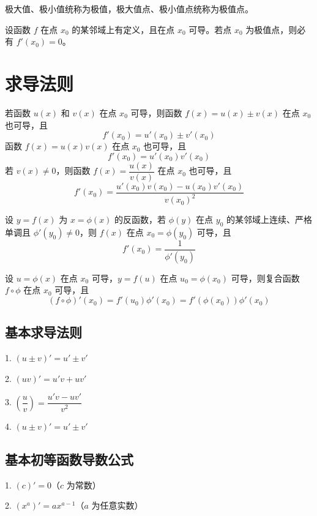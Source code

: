 极大值、极小值统称为极值，极大值点、极小值点统称为极值点。

\begin{theorem}[费马定理]
	设函数 $f$ 在点 $x_0$ 的某邻域上有定义，且在点 $x_0$ 可导。若点 $x_0$ 为极值点，则必有 $f'(x_0)=0$。
\end{theorem}

\section{求导法则}

\begin{theorem}
	若函数 $u(x)$ 和 $v(x)$ 在点 $x_0$ 可导，则函数 $f(x)=u(x)\pm v(x)$ 在点 $x_0$ 也可导，且
	$$f'(x_0) = u'(x_0)\pm v'(x_0)$$
	函数 $f(x)=u(x)v(x)$ 在点 $x_0$ 也可导，且
	$$f'(x_0) = u'(x_0)v'(x_0)$$
	若 $v(x)\ne 0$，则函数 $f(x)=\dfrac{u(x)}{v(x)}$ 在点 $x_0$ 也可导，且
	$$f'(x_0) = \frac{u'(x_0)v(x_0)-u(x_0)v'(x_0)}{v(x_0)^2}$$
\end{theorem}

\begin{theorem}
	设 $y=f(x)$ 为 $x=\phi(x)$ 的反函数，若 $\phi(y)$ 在点 $y_0$ 的某邻域上连续、严格单调且 $\phi'(y_0)\ne0$，则 $f(x)$ 在点 $x_0=\phi(y_0)$ 可导，且
	$$f'(x_0)=\frac{1}{\phi'(y_0)}$$
\end{theorem}

\begin{theorem}
	设 $u=\phi(x)$ 在点 $x_0$ 可导，$y=f(u)$ 在点 $u_0=\phi(x_0)$ 可导，则复合函数 $f\circ \phi$ 在点 $x_0$ 可导，且
	$$(f\circ \phi)'(x_0) = f'(u_0)\phi'(x_0) = f'(\phi(x_0))\phi'(x_0)$$
\end{theorem}

\subsection{基本求导法则}

1. $(u\pm v)' = u'\pm v'$

2. $(uv)' = u'v+uv'$

3. $\left(\dfrac{u}{v}\right) = \dfrac{u'v-uv'}{v^2}$

4. $(u\pm v)' = u'\pm v'$

\subsection{基本初等函数导数公式}

1. $(c)' = 0$（$c$ 为常数）

2. $(x^a)' = ax^{a-1}$（$a$ 为任意实数）

